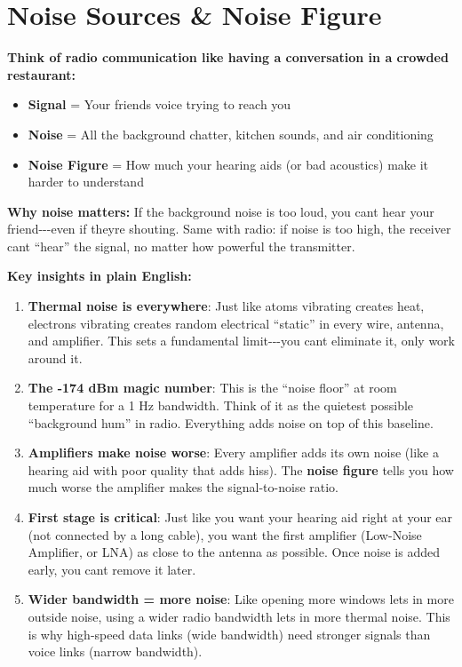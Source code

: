 \chapter{Noise Sources \& Noise Figure}
\label{ch:noise-figure}

\begin{nontechnical}

\textbf{Think of radio communication like having a conversation in a
crowded restaurant:}

\begin{itemize}
\tightlist
\item
  \textbf{Signal} = Your friend\textquotesingle s voice trying to reach
  you
\item
  \textbf{Noise} = All the background chatter, kitchen sounds, and air
  conditioning
\item
  \textbf{Noise Figure} = How much your hearing aids (or bad acoustics)
  make it harder to understand
\end{itemize}

\textbf{Why noise matters:} If the background noise is too loud, you
can\textquotesingle t hear your friend-\/-\/-even if
they\textquotesingle re shouting. Same with radio: if noise is too high,
the receiver can\textquotesingle t ``hear'' the signal, no matter how
powerful the transmitter.

\textbf{Key insights in plain English:}

\begin{enumerate}
\def\labelenumi{\arabic{enumi}.}
\item
  \textbf{Thermal noise is everywhere}: Just like atoms vibrating
  creates heat, electrons vibrating creates random electrical ``static''
  in every wire, antenna, and amplifier. This sets a fundamental
  limit-\/-\/-you can\textquotesingle t eliminate it, only work around
  it.
\item
  \textbf{The -174 dBm magic number}: This is the ``noise floor'' at
  room temperature for a 1 Hz bandwidth. Think of it as the quietest
  possible ``background hum'' in radio. Everything adds noise on top of
  this baseline.
\item
  \textbf{Amplifiers make noise worse}: Every amplifier adds its own
  noise (like a hearing aid with poor quality that adds hiss). The
  \textbf{noise figure} tells you how much worse the amplifier makes the
  signal-to-noise ratio.
\item
  \textbf{First stage is critical}: Just like you want your hearing aid
  right at your ear (not connected by a long cable), you want the first
  amplifier (Low-Noise Amplifier, or LNA) as close to the antenna as
  possible. Once noise is added early, you can\textquotesingle t remove
  it later.
\item
  \textbf{Wider bandwidth = more noise}: Like opening more windows lets
  in more outside noise, using a wider radio bandwidth lets in more
  thermal noise. This is why high-speed data links (wide bandwidth) need
  stronger signals than voice links (narrow bandwidth).
\end{enumerate}


\end{nontechnical}
